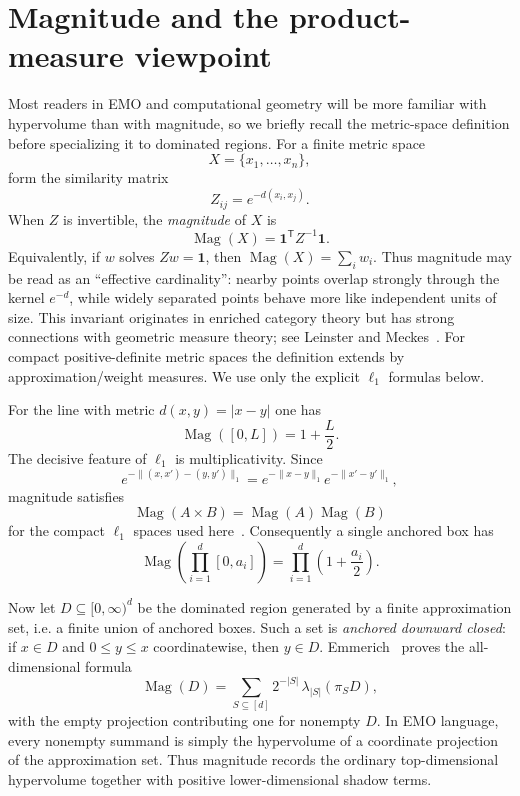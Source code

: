 \documentclass[12pt,a4paper]{article}
\theoremstyle{definition}
\newcommand{\Mag}{\operatorname{Mag}}
\newcommand{\1}{\mathbf 1}
\begin{document}
\section{Magnitude and the product-measure viewpoint}

Most readers in EMO and computational geometry will be more familiar with hypervolume than with magnitude, so we briefly recall the metric-space definition before specializing it to dominated regions. For a finite metric space
\[
X=\{x_1,\ldots,x_n\},
\]
form the similarity matrix
\[
Z_{ij}=e^{-d(x_i,x_j)}.
\]
When $Z$ is invertible, the \emph{magnitude} of $X$ is
\begin{equation}
\Mag(X)=\mathbf 1^{\mathsf T}Z^{-1}\mathbf 1.                 \label{eq:finitemag}
\end{equation}
Equivalently, if $w$ solves $Zw=\mathbf 1$, then $\Mag(X)=\sum_i w_i$. Thus magnitude may be read as an ``effective cardinality'': nearby points overlap strongly through the kernel $e^{-d}$, while widely separated points behave more like independent units of size. This invariant originates in enriched category theory but has strong connections with geometric measure theory; see Leinster and Meckes~\cite{LeinsterMeckes2017}. For compact positive-definite metric spaces the definition extends by approximation/weight measures. We use only the explicit $\ell_1$ formulas below.

For the line with metric $d(x,y)=|x-y|$ one has
\begin{equation}
\Mag([0,L])=1+\frac L2.                                      \label{eq:intervalmag}
\end{equation}
The decisive feature of $\ell_1$ is multiplicativity. Since
\[
e^{-\|(x,x')-(y,y')\|_1}=e^{-\|x-y\|_1}e^{-\|x'-y'\|_1},
\]
magnitude satisfies
\begin{equation}
\Mag(A\times B)=\Mag(A)\Mag(B)                              \label{eq:productmag}
\end{equation}
for the compact $\ell_1$ spaces used here~\cite{LeinsterMeckes2017}. Consequently a single anchored box has
\begin{equation}
\Mag\!\left(\prod_{i=1}^d[0,a_i]\right)
   =\prod_{i=1}^d\left(1+\frac{a_i}{2}\right).              \label{eq:boxmag}
\end{equation}

Now let $D\subseteq[0,\infty)^d$ be the dominated region generated by a finite approximation set, i.e. a finite union of anchored boxes. Such a set is \emph{anchored downward closed}: if $x\in D$ and $0\le y\le x$ coordinatewise, then $y\in D$. Emmerich~\cite{Emmerich2026} proves the all-dimensional formula
\begin{equation}
\boxed{\Mag(D)=\sum_{S\subseteq[d]}2^{-|S|}\,\lambda_{|S|}(\pi_S D),}   \label{eq:projection}
\end{equation}
with the empty projection contributing one for nonempty $D$. In EMO language, every nonempty summand is simply the hypervolume of a coordinate projection of the approximation set. Thus magnitude records the ordinary top-dimensional hypervolume together with positive lower-dimensional shadow terms.
\end{document}
